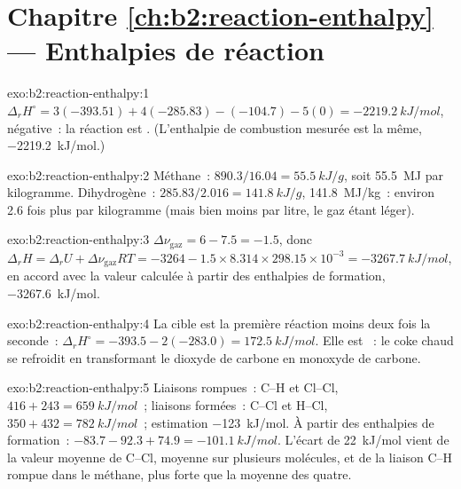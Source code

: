 \section*{Chapitre \ref{ch:b2:reaction-enthalpy} --- Enthalpies de réaction}

\begin{solution}{exo:b2:reaction-enthalpy:1}
$\Delta_r H^\circ = 3(-393.51) + 4(-285.83) - (-104.7) - 5(0) =
\qty{-2219.2}{kJ/mol}$, négative~: la réaction est . (L'enthalpie de
combustion mesurée est la même, \qty{-2219.2}{kJ/mol}.)
\end{solution}

\begin{solution}{exo:b2:reaction-enthalpy:2}
Méthane~: $890.3/16.04 = \qty{55.5}{kJ/g}$, soit \qty{55.5}{MJ} par
kilogramme. Dihydrogène~: $285.83/2.016 = \qty{141.8}{kJ/g}$,
\qty{141.8}{MJ/kg}~: environ 2.6 fois plus par kilogramme (mais bien moins par
litre, le gaz étant léger).
\end{solution}

\begin{solution}{exo:b2:reaction-enthalpy:3}
$\Delta\nu_{\text{gaz}} = 6 - 7.5 = -1.5$, donc $\Delta_r H = \Delta_r U +
\Delta\nu_{\text{gaz}}RT = -3264 - 1.5 \times 8.314 \times 298.15 \times
10^{-3} = \qty{-3267.7}{kJ/mol}$, en accord avec la valeur calculée à partir des
enthalpies de formation, \qty{-3267.6}{kJ/mol}.
\end{solution}

\begin{solution}{exo:b2:reaction-enthalpy:4}
La cible est la première réaction moins deux fois la seconde~:
$\Delta_r H^\circ = -393.5 - 2(-283.0) = \qty{+172.5}{kJ/mol}$. Elle est
~: le coke chaud se refroidit en transformant le dioxyde de carbone en monoxyde
de carbone.
\end{solution}

\begin{solution}{exo:b2:reaction-enthalpy:5}
Liaisons rompues~: C--H et Cl--Cl, $416 + 243 = \qty{659}{kJ/mol}$~; liaisons
formées~: C--Cl et H--Cl, $350 + 432 = \qty{782}{kJ/mol}$~; estimation
\qty{-123}{kJ/mol}. À partir des enthalpies de formation~: $-83.7 - 92.3 + 74.9 =
\qty{-101.1}{kJ/mol}$. L'écart de \qty{22}{kJ/mol} vient de la valeur moyenne de C--Cl,
moyenne sur plusieurs molécules, et de la liaison C--H rompue dans le
méthane, plus forte que la moyenne des quatre.
\end{solution}

